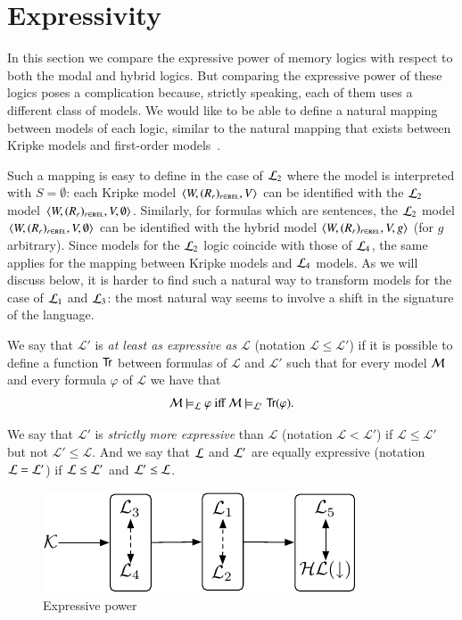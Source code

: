 \section{Expressivity}\label{expressivity}

In this section we compare the expressive power of memory logics
with respect to both the modal and hybrid logics.
But comparing the expressive power of these logics poses a complication
because, strictly speaking, each of them uses a different class of models.
We would like to be able to define a natural mapping between models
of each logic, similar to the natural mapping that exists between
Kripke models and first-order models~\cite{BRV01}.

Such a mapping is easy to define in the case of $\mathcal{L}_2$ where the model is interpreted with $S=\emptyset$: each
Kripke model $\langle W,(R_r)_{r \in \textsc{rel}},V \rangle$ can be identified with the $\mathcal{L}_2$
model $\langle W,(R_r)_{r \in \textsc{rel}}, V, \emptyset \rangle$. Similarly, for formulas
which are sentences, the $\mathcal{L}_2$ model $\langle W,(R_r)_{r \in \textsc{rel}},V,\emptyset \rangle$ can be identified with the hybrid model
$\langle W,(R_r)_{r \in \textsc{rel}},V,g \rangle$ (for $g$ arbitrary).
%
Since models for the $\mathcal{L}_2$ logic coincide with those of
$\mathcal{L}_4$, the same applies for the mapping between Kripke models
and $\mathcal{L}_4$ models.
%
As we will discuss below, it is harder to find such a natural way to
transform models for the case of $\mathcal{L}_1$ and $\mathcal{L}_3$: the most
natural way seems to involve a shift in the signature of the
language.

\begin{defn}
We say that
$\mathcal{L'}$ is \emph{at least as expressive as} $\mathcal{L}$
(notation $\mathcal{L} \le \mathcal{L'}$) if it is possible to
define a function ${\sf Tr}$ between formulas of  $\mathcal{L}$ and $\mathcal{L'}$
such that for every model $\mathcal{M}$ and every formula $\varphi$ of $\mathcal{L}$
we have that
\[
\mathcal{M} \models_\mathcal{L} \varphi \mbox{ iff } \mathcal{M} \models_{\mathcal{L}'} {\sf Tr}(\varphi).
\]

We say that $\mathcal{L'}$ is \emph{strictly more expressive} than $\mathcal{L}$
(notation $\mathcal{L} < \mathcal{L'}$) if $\mathcal{L} \le \mathcal{L'}$ but
not $\mathcal{L}' \le \mathcal{L}$.  And we say that $\mathcal{L}$ and $\mathcal{L}'$ are equally
expressive (notation $\mathcal{L} = \mathcal{L}'$) if $\mathcal{L} \le \mathcal{L}'$ and $\mathcal{L}' \le \mathcal{L}$.
\end{defn}

\begin{figure}
\begin{center}
\includegraphics{picture-logics.pdf}
\end{center}
\caption{Expressive power}\label{fig-expressivity}
\end{figure}

